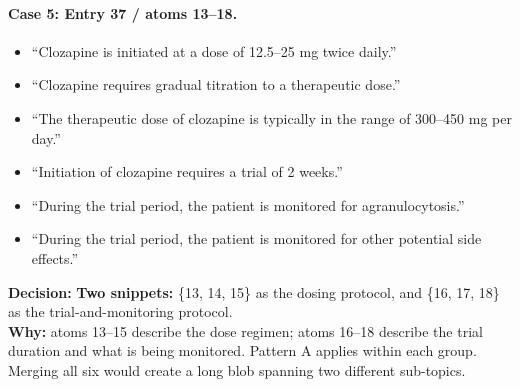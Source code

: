 \documentclass{article}
\begin{document}
\paragraph{Case 5: Entry 37 / atoms 13--18.}
\begin{itemize}[leftmargin=1.8em,labelsep=0.5em,itemsep=2pt,topsep=3pt]
    \item[\textit{atom 13:}] ``Clozapine is initiated at a dose of 12.5--25 mg twice daily.''
    \item[\textit{atom 14:}] ``Clozapine requires gradual titration to a therapeutic dose.''
    \item[\textit{atom 15:}] ``The therapeutic dose of clozapine is typically in the range of 300--450 mg per day.''
    \item[\textit{atom 16:}] ``Initiation of clozapine requires a trial of 2 weeks.''
    \item[\textit{atom 17:}] ``During the trial period, the patient is monitored for agranulocytosis.''
    \item[\textit{atom 18:}] ``During the trial period, the patient is monitored for other potential side effects.''
\end{itemize}
\noindent\textbf{Decision:} \textbf{Two snippets:} \{13, 14, 15\} as the dosing protocol, and \{16, 17, 18\} as the trial-and-monitoring protocol. \\
\noindent\textbf{Why:} atoms 13--15 describe the dose regimen; atoms 16--18 describe the trial duration and what is being monitored. Pattern A applies within each group. Merging all six would create a long blob spanning two different sub-topics.

\medskip
\end{document}
